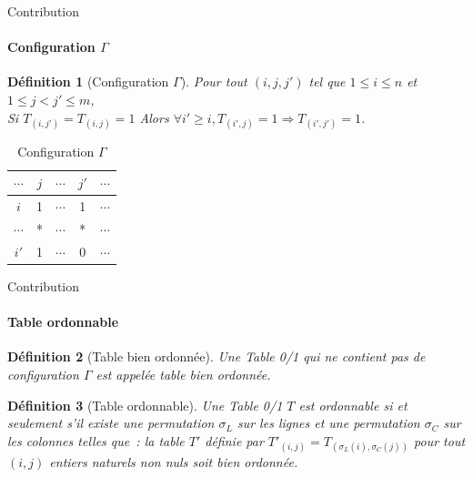 \documentclass{beamer}
\newtheorem{de}{Définition}
\begin{document}
  \begin{frame}{Contribution}
  \framesubtitle{Configuration $\Gamma$}
  \begin{de}[Configuration $\Gamma$]
  Pour tout $(i, j, j')$ tel que $1 \leq i \leq n$ et $1 \leq j < j' \leq m$,\\
  Si $T_{(i, j')} = T_{(i, j)} = 1$ Alors $\forall i'\geqslant i, T_{(i', j)} = 1 \Rightarrow T_{(i', j')} = 1$.
  \end{de}

  \begin{table}[htb]
  \centering
  \begin{tabular}{*{4}{c|} c}
  
	$\cdots$ & $j$ & $\cdots$ & $j'$ & $\cdots$\\
  \hline
	$i$ & 1 & $\cdots$ & 1 & $\cdots$\\
  \hline
	$\cdots$ & * & $\cdots$ & * & $\cdots$\\
  \hline
	$i'$ & 1 & $\cdots$ & 0 & $\cdots$
  \end{tabular}
  \caption{Configuration $\Gamma$}
  \label{gammma}
  \end{table}
  \end{frame}

  \begin{frame}{Contribution}
  \framesubtitle{Table ordonnable}
  \begin{de}[Table bien ordonnée]
  Une Table 0/1 qui ne contient pas de configuration $\Gamma$ est appelée
  table \textit{bien ordonnée}.
  \end{de}

  \begin{de}[Table ordonnable]
  Une Table 0/1 $T$ est \textit{ordonnable} si et seulement s'il existe une permutation $\sigma_L$ sur les lignes 
  et une permutation $\sigma_C$ sur les colonnes telles que~:
  la table $T'$ définie par $T'_{(i, j)} = T_{(\sigma_L(i), \sigma_C(j))}$ pour tout $(i, j)$ entiers naturels 
  non nuls soit bien ordonnée.
  \end{de}
  \end{frame}
\end{document}
